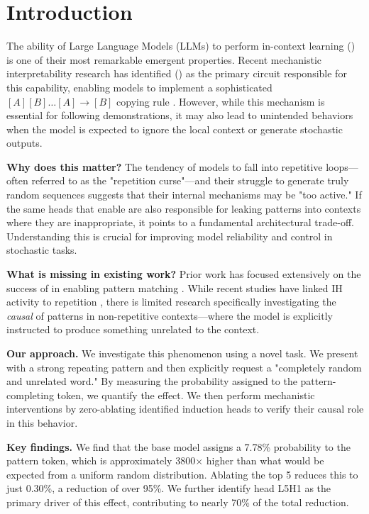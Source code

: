 \section{Introduction}
\label{sec:intro}

The ability of Large Language Models (LLMs) to perform in-context learning (\icl) is one of their most remarkable emergent properties. Recent mechanistic interpretability research has identified \textit{\inductionheads} (\ih) as the primary circuit responsible for this capability, enabling models to implement a sophisticated $[A][B] \dots [A] \rightarrow [B]$ copying rule \cite{olsson2022context}. However, while this mechanism is essential for following demonstrations, it may also lead to unintended behaviors when the model is expected to ignore the local context or generate stochastic outputs.

{\bf Why does this matter?}
The tendency of models to fall into repetitive loops—often referred to as the "repetition curse"—and their struggle to generate truly random sequences suggests that their internal mechanisms may be "too active." If the same heads that enable \icl are also responsible for leaking patterns into contexts where they are inappropriate, it points to a fundamental architectural trade-off. Understanding this \leakage is crucial for improving model reliability and control in stochastic tasks.

{\bf What is missing in existing work?}
Prior work has focused extensively on the success of \inductionheads in enabling pattern matching \cite{olsson2022context, edelman2024evolution}. While recent studies have linked IH activity to repetition \cite{wang2025induction}, there is limited research specifically investigating the \textit{causal \leakage} of patterns in non-repetitive contexts—where the model is explicitly instructed to produce something unrelated to the context.

{\bf Our approach.}
We investigate this phenomenon using a novel \taskname task. We present \gpttwo with a strong repeating pattern and then explicitly request a "completely random and unrelated word." By measuring the probability assigned to the pattern-completing token, we quantify the \leakage effect. We then perform mechanistic interventions by zero-ablating identified induction heads to verify their causal role in this behavior.

{\bf Key findings.}
We find that the base model assigns a 7.78\% probability to the pattern token, which is approximately 3800$\times$ higher than what would be expected from a uniform random distribution. Ablating the top 5 \inductionheads reduces this \leakage to just 0.30\%, a reduction of over 95\%. We further identify head L5H1 as the primary driver of this effect, contributing to nearly 70\% of the total \leakage reduction.

